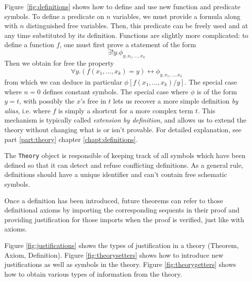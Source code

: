 Figure~\ref{fig:definitions} shows how to define and use new function and predicate symbols. To define a predicate on $n$ variables, we must provide a formula along with $n$ distinguished free variables. Then, this predicate can be freely used and at any time substituted by its definition. Functions are slightly more complicated: to define a function $f$, one must first prove a statement of the form
$$\exists ! y. \phi_{y, x_1,...,x_k}$$
Then we obtain for free the property
$$\forall y. (f(x_1,...,x_k)=y) \leftrightarrow \phi_{y, x_1,...,x_k}$$
from which we can deduce in particular $\phi[f(x_1,...,x_k)/y]$.
The special case where $n=0$ defines constant symbols. The special case where $\phi$ is of the form $y=t$, with possibly the $x$'s free in $t$ lets us recover a more simple definition \textit{by alias}, i.e. where  $f$ is simply a shortcut for a more complex term $t$.
This mechanism is typically called \textit{extension by definition}, and allows us to extend the theory without changing what is or isn't provable. For detailed explanation, see part \ref{part:theory} chapter \ref{chapt:definitions}.

The \lstinline{Theory}{} object is responsible of keeping track of all symbols which have been defined so that it can detect and refuse conflicting definitions. As a general rule, definitions should have a unique identifier and can't contain free schematic symbols.

Once a definition has been introduced, future theorems can refer to those definitional axioms by importing the corresponding sequents in their proof and providing justification for those imports when the proof is verified, just like with axioms.

Figure \ref{fig:justifications} shows the types of justification in a theory (Theorem, Axiom, Definition). Figure \ref{fig:theorysetters} shows how to introduce new justifications as well as symbols in the theory. Figure \ref{fig:theorygetters} shows how to obtain various types of information from the theory.




